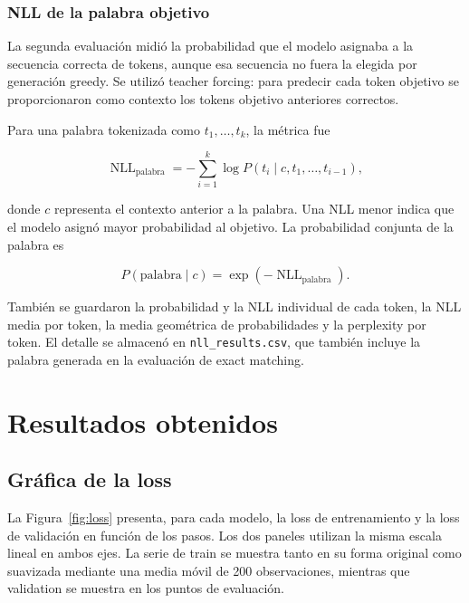 \documentclass[11pt,a4paper]{article}
\newcommand{\code}[1]{\texttt{#1}}
\begin{document}
\subsubsection{NLL de la palabra objetivo}

La segunda evaluación midió la probabilidad que el modelo asignaba a la
secuencia correcta de tokens, aunque esa secuencia no fuera la elegida por
generación greedy. Se utilizó teacher forcing: para predecir cada token objetivo
se proporcionaron como contexto los tokens objetivo anteriores correctos.

Para una palabra tokenizada como $t_1,\ldots,t_k$, la métrica fue

\begin{equation}
    \operatorname{NLL}_{\text{palabra}}
    = -\sum_{i=1}^{k}
    \log P\!\left(t_i \mid c,t_1,\ldots,t_{i-1}\right),
    \label{eq:nll}
\end{equation}

donde $c$ representa el contexto anterior a la palabra. Una NLL menor indica
que el modelo asignó mayor probabilidad al objetivo. La probabilidad conjunta
de la palabra es

\begin{equation}
    P(\text{palabra}\mid c)
    = \exp\!\left(-\operatorname{NLL}_{\text{palabra}}\right).
\end{equation}

También se guardaron la probabilidad y la NLL individual de cada token, la NLL
media por token, la media geométrica de probabilidades y la perplexity por
token. El detalle se almacenó en \code{nll\_results.csv}, que también incluye
la palabra generada en la evaluación de exact matching.


\section{Resultados obtenidos}

\subsection{Gráfica de la loss}

La Figura~\ref{fig:loss} presenta, para cada modelo, la loss de entrenamiento y
la loss de validación en función de los pasos. Los dos paneles utilizan la misma
escala lineal en ambos ejes. La serie de train se muestra tanto en su forma
original como suavizada mediante una media móvil de 200 observaciones, mientras
que validation se muestra en los puntos de evaluación.
\end{document}
